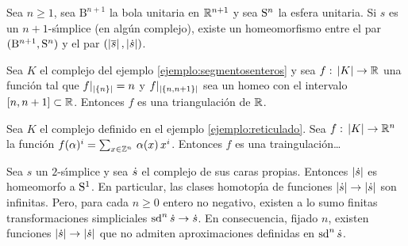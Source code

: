 \begin{ejemploBolaYEsfera}\label{ejemplo:bolayesfera}
	Sea $n\geq 1$, sea $\mathrm{B}^{n+1}$ la bola unitaria en
	$\bb{R}^{n+1}$ y sea $\esfera{n}$ la esfera unitaria. Si $s$ es un
	$n+1$-s\'{\i}mplice (en alg\'{u}n complejo), existe un homeomorfismo
	entre el par $(\mathrm{B}^{n+1},\esfera{n})$ y el par
	$(\geom{\caras{s}},\geom{\carasp{s}})$.
\end{ejemploBolaYEsfera}

\begin{ejemploSegmentosEnteros}\label{ejemplo:segmentosenterostriangulacion}
	Sea $K$ el complejo del ejemplo \ref{ejemplo:segmentosenteros} y sea
	$f:\,\geom{K}\rightarrow\bb{R}$ una funci\'{o}n tal que
	$f|_{\geom{\{n\}}}=n$ y $f|_{\geom{\{n,n+1\}}}$ sea un homeo con el
	intervalo $[n,n+1]\subset\bb{R}$. Entonces $f$ es una triangulaci\'{o}n
	de $\bb{R}$.
\end{ejemploSegmentosEnteros}

\begin{ejemploReticulado}\label{ejemplo:reticuladotriangulacion}
	Sea $K$ el complejo definido en el ejemplo \ref{ejemplo:reticulado}.
	Sea $f:\,\geom{K}\rightarrow\bb{R}^{n}$ la funci\'{o}n
	$f(\alpha)^{i}=\sum_{x\in\bb{Z}^{n}}\,\alpha(x)\,x^{i}$.
	Entonces $f$ es una traingulaci\'{o}n\dots
\end{ejemploReticulado}

\begin{ejemploAproximacionesEnElCirculo}%
	\label{ejemplo:aproximacionesenelcirculo}
	Sea $s$ un $2$-s\'{\i}mplice y sea $\carasp{s}$ el complejo de sus
	caras propias. Entonces $\geom{\carasp{s}}$ es homeomorfo a
	$\esfera{1}$. En particular, las clases homotop\'{\i}a de funciones
	$\geom{\carasp{s}}\rightarrow\geom{\carasp{s}}$ son infinitas.
	Pero, para cada $n\geq 0$ entero no negativo, existen a lo sumo
	finitas transformaciones simpliciales
	$\subdiv[n]{\carasp{s}}\rightarrow\carasp{s}$. En
	consecuencia, fijado $n$, existen funciones
	$\geom{\carasp{s}}\rightarrow\geom{\carasp{s}}$ que no admiten
	aproximaciones definidas en $\subdiv[n]{\carasp{s}}$.
\end{ejemploAproximacionesEnElCirculo}

